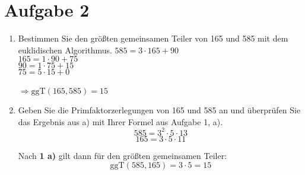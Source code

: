 \documentclass[11pt,a4paper,ngerman]{article}
\newcommand{\ggT}{\text{ggT}}
\begin{document}
\section*{Aufgabe 2}
\begin{enumerate}[\bfseries a)]

\item Bestimmen Sie den größten gemeinsamen Teiler von 165 und 585 mit dem euklidischen Algorithmus.
$585 = 3 \cdot 165 + 90$\\
$165 = 1 \cdot 90 + 75$\\
$90 = 1 \cdot 75 + 15$\\
$75 = 5 \cdot 15 + 0$\\
\\
$\Rightarrow \ggT (165,585) = 15$

\item Geben Sie die Primfaktorzerlegungen von 165 und 585 an und überprüfen Sie das Ergebnis aus a) mit Ihrer Formel aus Aufgabe 1, a).
$$585 = 3^2 \cdot 5 \cdot 13$$
$$165 = 3 \cdot 5 \cdot 11$$

Nach \textbf{1 a)} gilt dann für den größten gemeinsamen Teiler: \\
$$ \ggT (585, 165) = 3 \cdot 5 = 15 $$


\end{enumerate}
\end{document}
